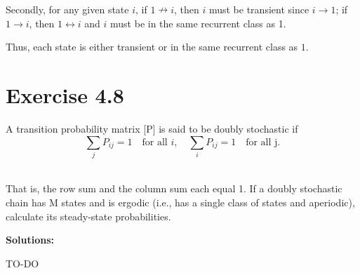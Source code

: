 \documentclass{article}
\begin{document}
    Secondly, for any given state $i$, if $1\nrightarrow i$, then $i$ must be transient since $i\rightarrow 1$; if $1\rightarrow i$, then $1\leftrightarrow i$ and $i$ must be in the same recurrent class as 1.

    Thus, each state is either transient or in the same recurrent class as $1$.

    \section{Exercise 4.8}
    A transition probability matrix [P] is said to be doubly stochastic if 
    \begin{equation*}
        \sum_j P_{ij}=1\quad\text{for all }i ,\quad\sum_i P_{ij}=1\quad\text{for all j.}
    \end{equation*}
    \

    That is, the row sum and the column sum each equal 1. If a doubly stochastic chain has $\text{M}$ states and is ergodic (i.e., has a single class of states and aperiodic), calculate its steady-state probabilities.

    \textbf{Solutions:}
    
    TO-DO
\end{document}
